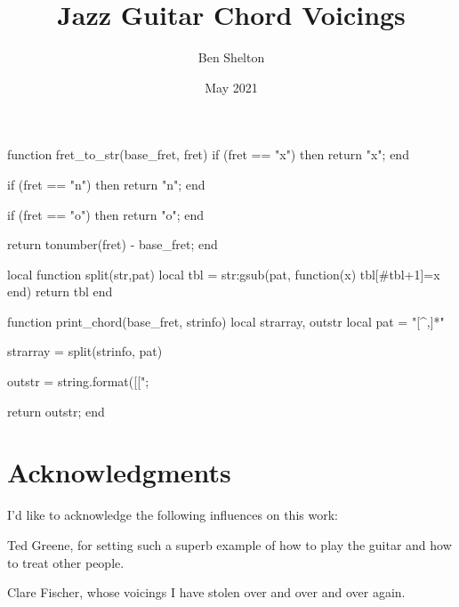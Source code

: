\documentclass[12pt]{report}
\newcommand{\authorname}{Ben Shelton}
\begin{document}
\begin{luacode*}
function fret_to_str(base_fret, fret)
        if (fret == "x") then
                return "x";
        end
        
        if (fret == "n") then
                return "n";
        end

        if (fret == "o") then
                return "o";
        end

        return tonumber(fret) - base_fret;
end

local function split(str,pat)
   local tbl = {}
   str:gsub(pat, function(x) tbl[#tbl+1]=x end)
   return tbl
end

function print_chord(base_fret, strinfo)
	local strarray, outstr
	local pat = "[^,]*"
        
        strarray = split(strinfo, pat)
        
        outstr = string.format([[\chord{%
        
        outstr = outstr .. fret_to_str(base_fret, strarray[1]) .. ",";
        outstr = outstr .. fret_to_str(base_fret, strarray[2]) .. ",";
        outstr = outstr .. fret_to_str(base_fret, strarray[3]) .. ",";
        outstr = outstr .. fret_to_str(base_fret, strarray[4]) .. ",";
        outstr = outstr .. fret_to_str(base_fret, strarray[5]) .. ",";
        outstr = outstr .. fret_to_str(base_fret, strarray[6]) .. "}";

        return outstr;
end
\end{luacode*}

\newcommand*{\abschord}[2]{%
\directlua{tex.print(print_chord(#1, [[#2]]))}%
}%

\newcommand{\achapter}[2]{
	\chapter{#1}
	\label{#2}
	\markright{\authorname \hfill Chapter \thechapter. #1 \hfill}
}

\title{Jazz Guitar Chord Voicings}
\author{Ben Shelton}
\date{May 2021}

\maketitle

\pagebreak

\chapter*{Acknowledgments}

I'd like to acknowledge the following influences on this work:

Ted Greene, for setting such a superb example of how to play the guitar and how to treat other people.

Clare Fischer, whose voicings I have stolen over and over and over again.

\tableofcontents
\pagebreak

\mediumchords





\end{document}
